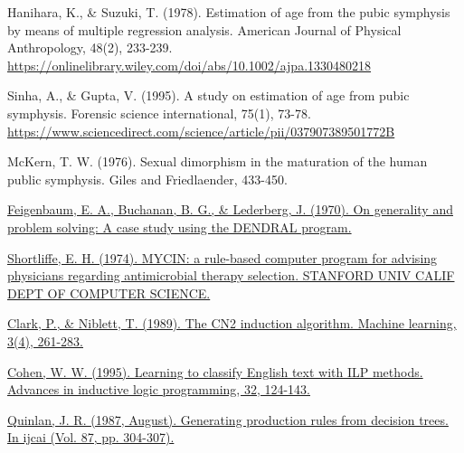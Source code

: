\begin{thebibliography}{9}

	Hanihara, K., \& Suzuki, T. (1978). Estimation of age from the pubic symphysis by means of multiple regression analysis. American Journal of Physical Anthropology, 48(2), 233-239. \url{https://onlinelibrary.wiley.com/doi/abs/10.1002/ajpa.1330480218}


	Sinha, A., \& Gupta, V. (1995). A study on estimation of age from pubic symphysis. Forensic science international, 75(1), 73-78. \url{https://www.sciencedirect.com/science/article/pii/037907389501772B}


	McKern, T. W. (1976). Sexual dimorphism in the maturation of the human public symphysis. Giles and Friedlaender, 433-450.


	\href{https://www.researchgate.net/profile/Bruce-Buchanan/publication/23865744_On_generality_and_problem_solving_A_case_study_using_the_DENDRAL_program/links/0c96052e1e6f7e6a57000000/On-generality-and-problem-solving-A-case-study-using-the-DENDRAL-program.pdf}{Feigenbaum, E. A., Buchanan, B. G., \& Lederberg, J. (1970). On generality and problem solving: A case study using the DENDRAL program.}


	\href{https://apps.dtic.mil/sti/citations/ADA001373}{Shortliffe, E. H. (1974). MYCIN: a rule-based computer program for advising physicians regarding antimicrobial therapy selection. STANFORD UNIV CALIF DEPT OF COMPUTER SCIENCE.}


	\href{https://link.springer.com/article/10.1023/A:1022641700528}{Clark, P., \& Niblett, T. (1989). The CN2 induction algorithm. Machine learning, 3(4), 261-283.}


	\href{https://citeseerx.ist.psu.edu/viewdoc/download?doi=10.1.1.14.4483&rep=rep1&type=pdf}{Cohen, W. W. (1995). Learning to classify English text with ILP methods. Advances in inductive logic programming, 32, 124-143.}


	\href{https://citeseerx.ist.psu.edu/viewdoc/download?doi=10.1.1.98.9054&rep=rep1&type=pdf}{Quinlan, J. R. (1987, August). Generating production rules from decision trees. In ijcai (Vol. 87, pp. 304-307).}


\end{thebibliography}

